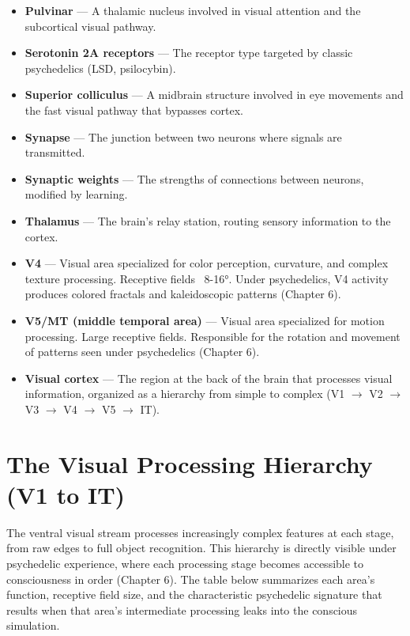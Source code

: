 \documentclass[11pt, twoside, openright]{book}
\begin{document}
\begin{itemize}
  \item \textbf{Pulvinar} --- A thalamic nucleus involved in visual attention and the subcortical visual pathway.
  \item \textbf{Serotonin 2A receptors} --- The receptor type targeted by classic psychedelics (LSD, psilocybin).
  \item \textbf{Superior colliculus} --- A midbrain structure involved in eye movements and the fast visual pathway that bypasses cortex.
  \item \textbf{Synapse} --- The junction between two neurons where signals are transmitted.
  \item \textbf{Synaptic weights} --- The strengths of connections between neurons, modified by learning.
  \item \textbf{Thalamus} --- The brain's relay station, routing sensory information to the cortex.
  \item \textbf{V4} --- Visual area specialized for color perception, curvature, and complex texture processing. Receptive fields ~8-16°. Under psychedelics, V4 activity produces colored fractals and kaleidoscopic patterns (Chapter 6).
  \item \textbf{V5/\allowbreak{}MT (middle temporal area)} --- Visual area specialized for motion processing. Large receptive fields. Responsible for the rotation and movement of patterns seen under psychedelics (Chapter 6).
  \item \textbf{Visual cortex} --- The region at the back of the brain that processes visual information, organized as a hierarchy from simple to complex (V1 $\rightarrow$ V2 $\rightarrow$ V3 $\rightarrow$ V4 $\rightarrow$ V5 $\rightarrow$ IT).
\end{itemize}

\section*{The Visual Processing Hierarchy (V1 to IT)}

The ventral visual stream processes increasingly complex features at each stage, from raw edges to full object recognition. This hierarchy is directly visible under psychedelic experience, where each processing stage becomes accessible to consciousness in order (Chapter 6). The table below summarizes each area's function, receptive field size, and the characteristic psychedelic signature that results when that area's intermediate processing leaks into the conscious simulation.
\end{document}
